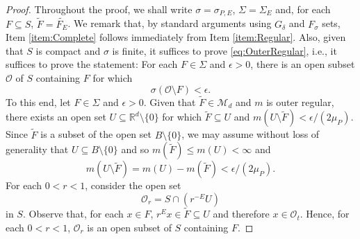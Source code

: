 \documentclass[11pt]{article}
\theoremstyle{remark}
\begin{document}
\begin{proof}
Throughout the proof, we shall write $\sigma=\sigma_{P,E}$, $\Sigma=\Sigma_E$ and, for each $F\subseteq S$, $\widetilde{F}=\widetilde{F_E}$. We remark that, by standard arguments using $G_\delta$ and $F_\sigma$ sets, Item \ref{item:Complete} follows immediately from Item \ref{item:Regular}. Also, given that $S$ is compact and $\sigma$ is finite, it suffices to prove \eqref{eq:OuterRegular}, i.e., it suffices to prove the statement: For each $F\in \Sigma$ and $\epsilon>0$, there is an open subset $\mathcal{O}$ of $S$ containing $F$ for which 
\begin{equation*}
\sigma(\mathcal{O}\setminus F)<\epsilon.
\end{equation*}
To this end, let $F\in \Sigma$ and $\epsilon>0$. Given that $\widetilde{F}\in\mathcal{M}_d$ and $m$ is outer regular, there exists an open set $U\subseteq \mathbb{R}^d\setminus\{0\}$ for which $\widetilde{F}\subseteq U$ and $m(U\setminus\widetilde{F})<\epsilon/(2\mu_P)$. Since $\widetilde{F}$ is a subset of the open set $B\setminus\{0\}$, we may assume without loss of generality that $U\subseteq B\setminus\{0\}$ and so $m(\widetilde{F})\leq m(U)<\infty$ and
\begin{equation}\label{eq:LebesgueOuter}
m(U\setminus \widetilde{F})=m(U)-m(\widetilde{F})<\epsilon/(2\mu_P).
\end{equation}
For each $0<r<1$, consider the open set
\begin{equation*}
\mathcal{O}_r=S\cap\left( r^{-E}U\right)
\end{equation*}
in $S$. Observe that, for each $x\in F$, $r^E x\in \widetilde{F}\subseteq U$ and therefore $x\in \mathcal{O}_t$. Hence, for each $0<r<1$, $\mathcal{O}_r$ is an open subset of $S$ containing $F$. 


\end{proof}
\end{document}
